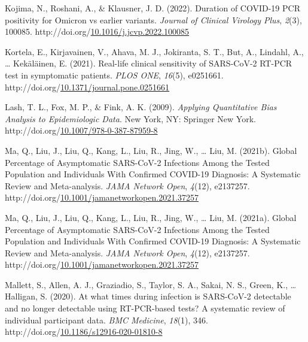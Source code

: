 \documentclass[12pt,twoside]{smiththesis}
\newlength{\cslhangindent}
\newenvironment{CSLReferences}[2] %
 {%
\setlength{\parindent}{0pt}
\ifodd #1 \everypar{\setlength{\hangindent}{\cslhangindent}}\ignorespaces\fi
\ifnum #2 > 0
\setlength{\parskip}{#2\baselineskip}
  \fi
}%
{}
\begin{document}
\begin{CSLReferences}{1}{0}
\leavevmode{}%
Kojima, N., Roshani, A., \& Klausner, J. D. (2022). Duration of {COVID-19 PCR} positivity for {Omicron} vs earlier variants. \emph{Journal of Clinical Virology Plus}, \emph{2}(3), 100085. http://doi.org/\href{https://doi.org/10.1016/j.jcvp.2022.100085}{10.1016/j.jcvp.2022.100085}

\leavevmode{}%
Kortela, E., Kirjavainen, V., Ahava, M. J., Jokiranta, S. T., But, A., Lindahl, A., \ldots{} Kekäläinen, E. (2021). Real-life clinical sensitivity of {SARS-CoV-2 RT-PCR} test in symptomatic patients. \emph{PLOS ONE}, \emph{16}(5), e0251661. http://doi.org/\href{https://doi.org/10.1371/journal.pone.0251661}{10.1371/journal.pone.0251661}

\leavevmode{}%
Lash, T. L., Fox, M. P., \& Fink, A. K. (2009). \emph{Applying {Quantitative Bias Analysis} to {Epidemiologic Data}}. {New York, NY}: {Springer New York}. http://doi.org/\href{https://doi.org/10.1007/978-0-387-87959-8}{10.1007/978-0-387-87959-8}

\leavevmode{}%
Ma, Q., Liu, J., Liu, Q., Kang, L., Liu, R., Jing, W., \ldots{} Liu, M. (2021b). Global {Percentage} of {Asymptomatic SARS-CoV-2 Infections Among} the {Tested Population} and {Individuals With Confirmed COVID-19 Diagnosis}: {A Systematic Review} and {Meta-analysis}. \emph{JAMA Network Open}, \emph{4}(12), e2137257. http://doi.org/\href{https://doi.org/10.1001/jamanetworkopen.2021.37257}{10.1001/jamanetworkopen.2021.37257}

\leavevmode{}%
Ma, Q., Liu, J., Liu, Q., Kang, L., Liu, R., Jing, W., \ldots{} Liu, M. (2021a). Global {Percentage} of {Asymptomatic SARS-CoV-2 Infections Among} the {Tested Population} and {Individuals With Confirmed COVID-19 Diagnosis}: {A Systematic Review} and {Meta-analysis}. \emph{JAMA Network Open}, \emph{4}(12), e2137257. http://doi.org/\href{https://doi.org/10.1001/jamanetworkopen.2021.37257}{10.1001/jamanetworkopen.2021.37257}

\leavevmode{}%
Mallett, S., Allen, A. J., Graziadio, S., Taylor, S. A., Sakai, N. S., Green, K., \ldots{} Halligan, S. (2020). At what times during infection is {SARS-CoV-2} detectable and no longer detectable using {RT-PCR-based} tests? {A} systematic review of individual participant data. \emph{BMC Medicine}, \emph{18}(1), 346. http://doi.org/\href{https://doi.org/10.1186/s12916-020-01810-8}{10.1186/s12916-020-01810-8}


\end{CSLReferences}
\end{document}
